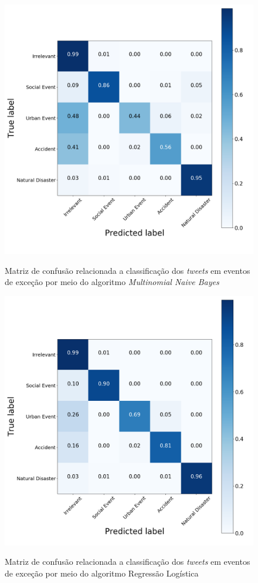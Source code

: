 \documentclass[
	12pt,				%
	oneside,			%
	a4paper,			%
	english,			%
	brazil				%
	]{abntex2ppgsi}
\begin{document}
\begin{apendicesenv}
\begin{figure}[!htb]
	\centering
 	  \caption{Matriz de confusão relacionada a classificação dos \textit{tweets} em eventos de exceção por meio do algoritmo \textit{Multinomial Naive Bayes}}
		\includegraphics[width=1\linewidth]{images/confusion_matrix_mnb.png}
	\label{fig:confusion_matrix_mnb}
\end{figure}

\begin{figure}[!htb]
	\centering
 	  \caption{Matriz de confusão relacionada a classificação dos \textit{tweets} em eventos de exceção por meio do algoritmo Regressão Logística}
		\includegraphics[width=1\linewidth]{images/confusion_matrix_rl.png}
	\label{fig:confusion_matrix_rl}
\end{figure}


\end{apendicesenv}
\end{document}
